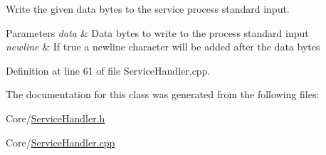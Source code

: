 Write the given data bytes to the service process standard input. 


\begin{DoxyParams}{Parameters}
{\em data} & Data bytes to write to the process standard input \\
\hline
{\em newline} & If true a newline character will be added after the data bytes \\
\hline
\end{DoxyParams}


Definition at line 61 of file Service\+Handler.\+cpp.



The documentation for this class was generated from the following files\+:\begin{DoxyCompactItemize}
\item 
Core/\hyperlink{_service_handler_8h}{Service\+Handler.\+h}\item 
Core/\hyperlink{_service_handler_8cpp}{Service\+Handler.\+cpp}\end{DoxyCompactItemize}
